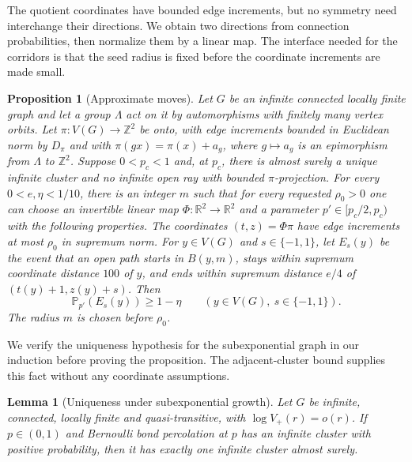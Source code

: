 \documentclass[11pt]{article}
\newtheorem{proposition}[theorem]{Proposition}
\newtheorem{lemma}[theorem]{Lemma}
\theoremstyle{definition}
\begin{document}
The quotient coordinates have bounded edge increments, but no symmetry
need interchange their directions. We obtain two directions from
connection probabilities, then normalize them by a linear map. The
interface needed for the corridors is that the seed radius is fixed
before the coordinate increments are made small.

\begin{proposition}[Approximate moves]\label{prop:moves}
Let $G$ be an infinite connected locally finite graph and let a group
$\Lambda$ act on it by automorphisms with finitely many vertex orbits.
Let $\pi:V(G)\to\mathbb Z^2$ be onto, with edge increments
bounded in Euclidean norm by $D_\pi$ and with
$\pi(gx)=\pi(x)+a_g$, where
$g\mapsto a_g$ is an epimorphism from $\Lambda$ to $\mathbb Z^2$.
Suppose $0<p_c<1$ and, at $p_c$, there is almost surely a unique
infinite cluster and no infinite open ray with bounded $\pi$-projection.
For every \(0<e,\eta<1/10\), there is an integer \(m\) such that
for every requested \(\rho_0>0\) one can choose an invertible linear map
\(\Phi:\mathbb R^2\to\mathbb R^2\) and a parameter
\(p'\in[p_c/2,p_c)\) with the following properties.
The coordinates \((t,z)=\Phi\pi\) have edge increments at most
\(\rho_0\) in supremum norm. For $y\in V(G)$ and
$s\in\{-1,1\}$, let $E_s(y)$ be the event that an open path starts
in $B(y,m)$, stays within supremum coordinate distance $100$ of $y$,
and ends within supremum distance $e/4$ of
$(t(y)+1,z(y)+s)$. Then
\[
 \mathbb P_{p'}(E_s(y))\ge1-\eta
 \qquad(y\in V(G),\ s\in\{-1,1\}).
\]
The radius $m$ is chosen before $\rho_0$.
\end{proposition}

We verify the uniqueness hypothesis for the subexponential graph in
our induction before proving the proposition. The adjacent-cluster
bound supplies this fact without any coordinate assumptions.

\begin{lemma}[Uniqueness under subexponential growth]\label{lem:uniqueness}
Let $G$ be infinite, connected, locally finite and quasi-transitive, with
$\log V_+(r)=o(r)$. If $p\in(0,1)$ and Bernoulli bond percolation at $p$
has an infinite cluster with positive probability, then it has exactly
one infinite cluster almost surely.
\end{lemma}
\end{document}
